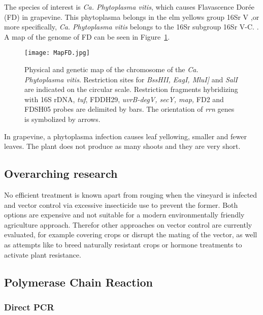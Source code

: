 \documentclass[a4paper]{article}
\begin{document}
The species of interest is \textit{Ca. Phytoplasma vitis}, which causes Flavascence Dor\'ee (FD) in grapevine. This phytoplasma belongs in the elm yellows group 16Sr V \cite{p11}
,or more specifically, \textit{Ca. Phytoplasma vitis} belongs to the 16Sr subgroup 16Sr V-C. \cite{p13}. A map of the genome of FD can be seen in Figure~\ref{fig:mapfd}.

\begin{figure}[H]
	\centering
	\texttt{[image: MapFD.jpg]}
	\caption[Physical and genetic map of the chromosome of the \textit{Ca. Phytoplasma vitis}]{Physical and genetic map of the chromosome of the \textit{Ca. Phytoplasma vitis}. Restriction sites for \textit{BssHII, EagI, MluI]} and \textit{SalI} are indicated on the circular scale. Restriction fragments hybridizing with 16S rDNA, \textit{tuf}, FDDH29, \textit{uvrB-degV, secY, map,} FD2 and FDSH05 probes are delimited by bars. The orientation of \textit{rrn} genes is symbolized by arrows. \cite{p16}}
	\label{fig:mapfd}
\end{figure}

In grapevine, a phytoplasma infection causes leaf yellowing, smaller and fewer leaves. The plant does not produce as many shoots and they are very short.

\subsection{Overarching research}
No efficient treatment is known apart from rouging when the vineyard is infected and vector control via excessive insecticide use to prevent the former. 
Both options are expensive and not suitable for a modern environmentally friendly agriculture approach. 
Therefor other approaches on vector control are currently evaluated, for example covering crops or disrupt the mating of the vector, as well as attempts like to breed naturally resistant crops or hormone treatments to activate plant resistance.



\subsection{Polymerase Chain Reaction}
\subsubsection{Direct PCR}
\end{document}
